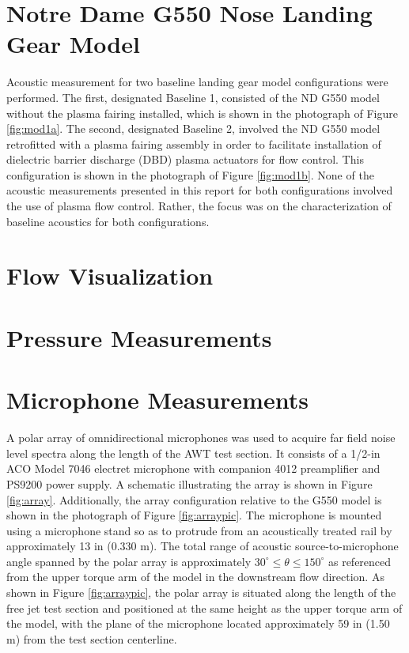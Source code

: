 \section{Notre Dame G550 Nose Landing Gear Model}
Acoustic measurement for two baseline landing gear model configurations were performed. The first, designated Baseline 1, consisted of the ND G550 model without the plasma fairing installed, which is shown in the photograph of Figure \ref{fig:mod1a}. The second, designated Baseline 2, involved the ND G550 model retrofitted with a plasma fairing assembly in order to facilitate installation of dielectric barrier discharge (DBD) plasma actuators for flow control. This configuration is shown in the photograph of Figure \ref{fig:mod1b}. None of the acoustic measurements presented in this report for both configurations involved the use of plasma flow control. Rather, the focus was on the characterization of baseline acoustics for both configurations.

\section{Flow Visualization}

\section{Pressure Measurements}

\section{Microphone Measurements}
A polar array of omnidirectional microphones was used to acquire far field noise level spectra along the length of the AWT test section. It consists of a 1/2-in ACO Model 7046 electret microphone with companion 4012 preamplifier and PS9200 power supply. A schematic illustrating the array is shown in Figure \ref{fig:array}. Additionally, the array configuration relative to the G550 model is shown in the photograph of Figure \ref{fig:arraypic}. The microphone is mounted using a microphone stand so as to protrude from an acoustically treated rail by approximately 13 in (0.330 m). The total range of acoustic source-to-microphone angle spanned by the polar array is approximately $30^\circ \leq \theta \leq 150^\circ$ as referenced from the upper torque arm of the model in the downstream flow direction. As shown in Figure \ref{fig:arraypic}, the polar array is situated along the length of the free jet test section and positioned at the same height as the upper torque arm of the model, with the plane of the microphone located approximately 59 in (1.50 m) from the test section centerline.

